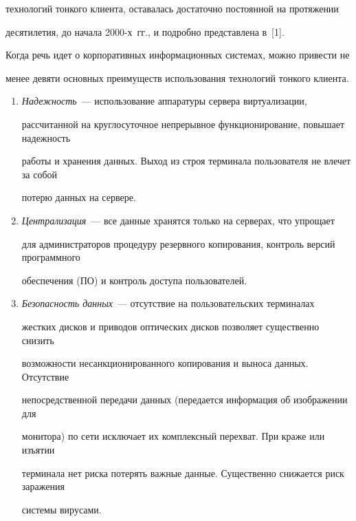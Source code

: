 технологий тонкого клиента, оставалась достаточно постоянной на протяжении 


десятилетия, до начала 2000-х~гг., и подробно представлена в~[1].


       


       Когда речь идет о корпоративных информационных системах, можно при\-вес\-ти не 


менее девяти основных преимуществ использования технологий тонкого клиента.


       \begin{enumerate}[1.]


\item       \textit{Надежность}~--- использование аппаратуры сервера виртуализации, 


рассчитанной на круглосуточное непрерывное функционирование, повышает надежность 


работы и хранения данных. Выход из строя терминала пользователя не влечет за собой 


потерю данных на сервере.\\[-10pt]


     \item  


       \textit{Централизация}~--- все данные хранятся только на серверах, что упрощает 


для администраторов процедуру резервного копирования, контроль версий программного 


обеспечения (ПО) и контроль доступа пользователей.\\[-10pt]


      \item 


       \textit{Безопасность данных}~--- отсутствие на пользовательских терминалах 


жестких дисков и приводов оптических дисков позволяет существенно снизить 


возможности несанкционированного копирования и выноса данных. Отсутствие 


непосредственной передачи данных (передается информация об изображении для 


монитора) по сети исключает их комплексный перехват. При краже или изъятии 


терминала нет риска потерять важные данные. Существенно снижается риск заражения 


системы вирусами.\\[-10pt]



\end{enumerate}
